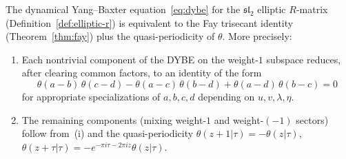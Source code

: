 \begin{proposition}
\label{prop:dybe-reduces-to-fay}
The dynamical Yang--Baxter equation~\eqref{eq:dybe}
for the $\mathfrak{sl}_2$ elliptic $R$-matrix
\textup{(}Definition~\textup{\ref{def:elliptic-r})}
is equivalent to the Fay trisecant identity
\textup{(}Theorem~\textup{\ref{thm:fay})} plus the
quasi-periodicity of $\theta$. More precisely:
\begin{enumerate}[label=\textup{(\roman*)}]
\item Each nontrivial component of the DYBE on the
weight-$1$ subspace reduces, after clearing common
factors, to an identity of the form
\begin{equation}\label{eq:fay-applied}
\theta(a{-}b)\,\theta(c{-}d)
- \theta(a{-}c)\,\theta(b{-}d)
+ \theta(a{-}d)\,\theta(b{-}c) = 0
\end{equation}
for appropriate specializations of $a, b, c, d$ depending
on $u, v, \lambda, \eta$.
\item The remaining components (mixing weight-$1$ and
weight-$(-1)$ sectors) follow from~(i) and the
quasi-periodicity $\theta(z+1|\tau) = -\theta(z|\tau)$,
$\theta(z+\tau|\tau) = -e^{-\pi i\tau - 2\pi i z}\theta(z|\tau)$.
\end{enumerate}
\end{proposition}

